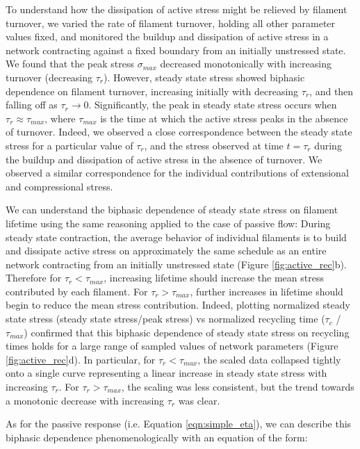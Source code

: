 \documentclass[10pt,letterpaper]{article}
\begin{document}
To understand how the dissipation of active stress might be relieved by filament turnover, we varied the rate of filament turnover, holding all other parameter values fixed, and monitored the buildup and dissipation of active stress in a network contracting against a fixed boundary from an initially unstressed state. We found that the peak stress $\sigma_{max}$ decreased monotonically with increasing turnover (decreasing $\tau_r$).  However, steady state stress showed biphasic dependence on filament turnover, increasing initially with  decreasing $\tau_r$, and then falling off as $\tau_r \to 0$.  Significantly, the peak in steady state stress occurs when $\tau_r \approx\tau_{max}$, where $\tau_{max}$ is the time at which the active stress peaks in the absence of turnover.  Indeed, we observed a close correspondence between the steady state stress for a particular value of $\tau_r$, and the stress observed at time $t = \tau_r$ during the buildup and dissipation of active stress in the absence of turnover.  We observed a similar correspondence for the individual contributions of extensional and compressional stress. 

We can understand the biphasic dependence of steady state stress on filament lifetime using the same reasoning applied to the case of passive flow:   During steady state contraction, the average behavior of individual filaments is to build and dissipate active stress on approximately the same schedule as an entire network contracting from an initially unstressed state (Figure \ref{fig:active_rec}b). Therefore for $\tau_r < \tau_{max}$, increasing lifetime should increase the mean stress contributed by each filament. For $\tau_r > \tau_{max}$, further increases in lifetime should begin to reduce the mean stress contribution. Indeed, plotting normalized steady state stress (steady state stress/peak stress) vs normalized recycling time ($\tau_c$ /$\tau_{max}$) confirmed that this biphasic dependence of steady state stress on recycling times holds for a large range of sampled values of network parameters (Figure \ref{fig:active_rec}d). In particular, for $\tau_r < \tau_{max}$, the scaled data collapsed tightly onto a single curve representing a linear increase in steady state stress with increasing $\tau_r$. For $\tau_r > \tau_{max}$, the scaling was less consistent, but the trend towards a monotonic decrease with increasing $\tau_r$ was clear.


As for the passive response (i.e. Equation \ref{eqn:simple_eta}), we can describe this biphasic dependence phenomenologically with an equation of the form:
\end{document}
